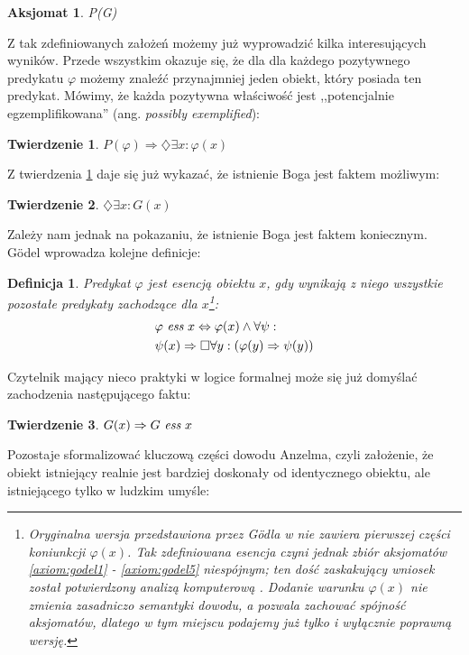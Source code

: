 \documentclass[runningheads]{llncs}
\newtheorem{theorem-pl}{Twierdzenie}
\newtheorem{definition-pl}{Definicja}
\newtheorem{axiom-pl}{Aksjomat}
\begin{document}
\begin{axiom-pl} \label{axiom:godel4}
	P(G)
\end{axiom-pl}
\noindent Z tak zdefiniowanych założeń możemy już wyprowadzić kilka interesujących wyników. Przede wszystkim okazuje się, że dla dla każdego pozytywnego predykatu $\varphi$ możemy znaleźć przynajmniej jeden obiekt, który posiada ten predykat. Mówimy, że każda pozytywna właściwość jest ,,potencjalnie egzemplifikowana'' (ang. \emph{possibly exemplified}):
\begin{theorem-pl} \label{th:godel1}
	$P(\varphi) \Rightarrow \diamondsuit \exists x: \varphi(x)$
\end{theorem-pl}
\noindent Z twierdzenia \ref{th:godel1} daje się już wykazać, że istnienie Boga jest faktem możliwym:
\begin{theorem-pl} \label{th:godel2}
	$\diamondsuit \exists x: G(x)$
\end{theorem-pl}
\noindent Zależy nam jednak na pokazaniu, że istnienie Boga jest faktem koniecznym. G\"odel wprowadza kolejne definicje:
\begin{definition-pl} \label{def:godel-essence}
	Predykat $\varphi$ jest \emph{esencją} obiektu $x$, gdy wynikają z niego wszystkie pozostałe predykaty zachodzące dla $x$\footnote{Oryginalna wersja przedstawiona przez G\"odla w \cite{goedel2004} nie zawiera pierwszej części koniunkcji $\varphi(x)$. Tak zdefiniowana esencja czyni jednak zbiór aksjomatów \ref{axiom:godel1} - \ref{axiom:godel5} niespójnym; ten dość zaskakujący wniosek został potwierdzony analizą komputerową \cite{benzmuller2014}. Dodanie warunku $\varphi(x)$ nie zmienia zasadniczo semantyki dowodu, a pozwala zachować spójność aksjomatów, dlatego w tym miejscu podajemy już tylko i wyłącznie poprawną wersję.}:
	\begin{align*}
	& \varphi\ \emph{ess}\ x \Leftrightarrow \varphi(x) \wedge \forall \psi: \\ 
	& \psi(x) \Rightarrow \Box \forall y: \left( \varphi(y) \Rightarrow \psi(y) \right)
	\end{align*}
\end{definition-pl}
\noindent Czytelnik mający nieco praktyki w logice formalnej może się już domyślać zachodzenia następującego faktu:
\begin{theorem-pl} \label{th:godel3}
	$G(x) \Rightarrow G\ \emph{ess}\ x$
\end{theorem-pl}
\noindent Pozostaje sformalizować kluczową części dowodu Anzelma, czyli założenie, że obiekt istniejący realnie jest bardziej doskonały od identycznego obiektu, ale istniejącego tylko w ludzkim umyśle: 
\end{document}
